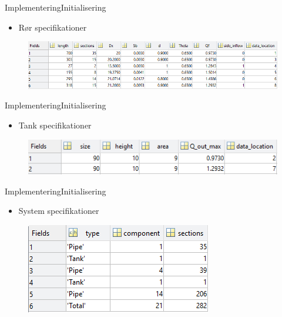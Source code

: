 \begin{frame}{Implementering}{Initialisering}
 \vfill\vfill\centering  
 \begin{itemize}
 	\item Rør specifikationer
 \end{itemize}
\begin{figure}[!h]
\centering
\includegraphics[width=0.97 \textwidth]{figures/Fredericia_pipe_setup2.PNG}
\label{fig:Fredericia_pipe_setup}
\end{figure}
 \vfill\vfill

\end{frame}

\begin{frame}{Implementering}{Initialisering}
 \vfill\vfill\centering  
 \begin{itemize}
 	\item Tank specifikationer 
 \end{itemize}
    \begin{figure}[H]
\centering
\includegraphics[width=0.5 \textwidth]{figures/tank_spec}
\label{fig:Fredericia_pipe_setup}
\end{figure}
 \vfill\vfill
\end{frame}

\begin{frame}{Implementering}{Initialisering}
     \vfill\vfill\centering  
     \begin{itemize}
     	\item System specifikationer
     \end{itemize}
\begin{figure}[H]
\centering
\includegraphics[width=0.5 \textwidth]{figures/sys_setup_matlab.png}
\label{fig:sys_setup_matlab}
\end{figure}
 \vfill\vfill
\end{frame}

